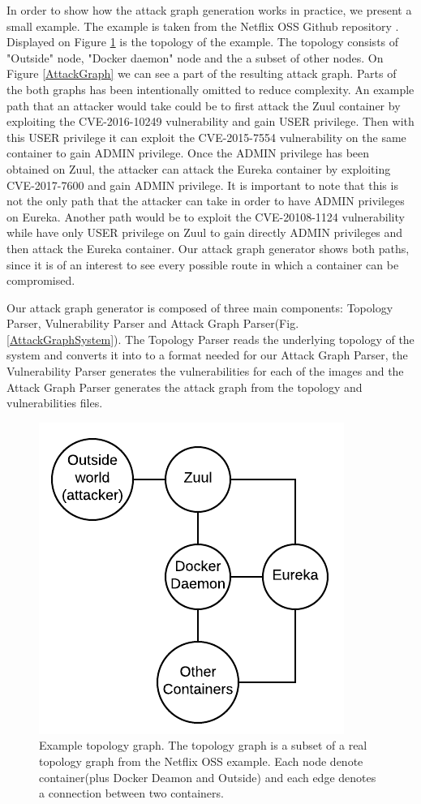 In order to show how the attack graph generation works in practice, we present a small example. The example is taken from the Netflix OSS Github repository \cite{netflixoss}. Displayed on Figure \ref{TopologyGraph} is the topology of the example. The topology consists of "Outside" node, "Docker daemon" node and the a subset of other nodes. On Figure \ref{AttackGraph} we can see a part of the resulting attack graph. Parts of the both graphs has been intentionally omitted to reduce complexity. An example path that an attacker would take could be to first attack the Zuul container by exploiting the CVE-2016-10249 vulnerability and gain USER privilege. Then with this USER privilege it can exploit the CVE-2015-7554 vulnerability on the same container to gain ADMIN privilege. Once the ADMIN privilege has been obtained on Zuul, the attacker can attack the Eureka container by exploiting CVE-2017-7600 and gain ADMIN privilege. It is important to note that this is not the only path that the attacker can take in order to have ADMIN privileges on Eureka. Another path would be to exploit the CVE-20108-1124 vulnerability while have only USER privilege on Zuul to gain directly ADMIN privileges and then attack the Eureka container. Our attack graph generator shows both paths, since it is of an interest to see every possible route in which a container can be compromised.

Our attack graph generator is composed of three main components: Topology Parser, Vulnerability Parser and Attack Graph Parser(Fig. \ref{AttackGraphSystem}). The Topology Parser reads the underlying topology of the system and converts it into to a format needed for our Attack Graph Parser, the Vulnerability Parser generates the vulnerabilities for each of the images and the Attack Graph Parser generates the attack graph from the topology and vulnerabilities files. 

\begin{figure}
	\includegraphics[]{./images/Topology_graph}
	\caption{Example topology graph. The topology graph is a subset of a real topology graph from the Netflix OSS example. Each node denote container(plus Docker Deamon and Outside) and each edge denotes a connection between two containers.}
	\label{TopologyGraph}
\end{figure}

